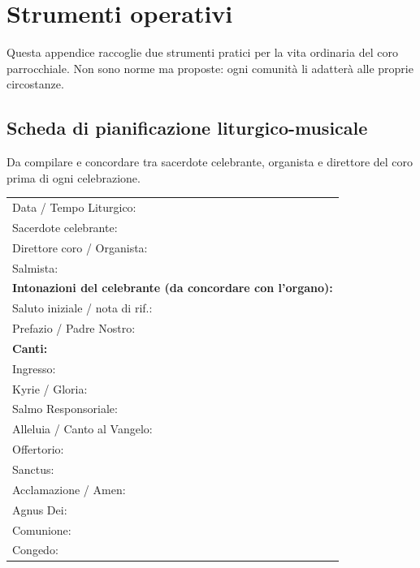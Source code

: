 \documentclass[12pt,a4paper]{article}
\begin{document}
	\section{Strumenti operativi}
	
	Questa appendice raccoglie due strumenti pratici per la vita ordinaria del coro
	parrocchiale. Non sono norme ma proposte: ogni comunità li adatterà alle proprie
	circostanze.
	
	\subsection*{Scheda di pianificazione liturgico-musicale}
	
	\medskip
	\noindent Da compilare e concordare tra sacerdote celebrante, organista e
	direttore del coro prima di ogni celebrazione.
	
	\bigskip
	\noindent
	\begin{tabular}{p{6.5cm}p{7cm}}
		Data / Tempo Liturgico:     & \hrulefill \\[7pt]
		Sacerdote celebrante:       & \hrulefill \\[7pt]
		Direttore coro / Organista: & \hrulefill \\[7pt]
		Salmista:                   & \hrulefill \\[14pt]
		\multicolumn{2}{l}{\textbf{Intonazioni del celebrante (da concordare con l'organo):}} \\[5pt]
		Saluto iniziale / nota di rif.: & \hrulefill \\[7pt]
		Prefazio / Padre Nostro:        & \hrulefill \\[14pt]
		\multicolumn{2}{l}{\textbf{Canti:}} \\[5pt]
		Ingresso:                  & \hrulefill \\[7pt]
		Kyrie / Gloria:            & \hrulefill \\[7pt]
		Salmo Responsoriale:       & \hrulefill \\[7pt]
		Alleluia / Canto al Vangelo: & \hrulefill \\[7pt]
		Offertorio:                & \hrulefill \\[7pt]
		Sanctus:                   & \hrulefill \\[7pt]
		Acclamazione / Amen:       & \hrulefill \\[7pt]
		Agnus Dei:                 & \hrulefill \\[7pt]
		Comunione:                 & \hrulefill \\[7pt]
		Congedo:                   & \hrulefill \\
	\end{tabular}
	
\end{document}
